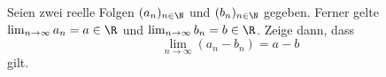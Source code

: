 \begin{exercise}
  Seien zwei reelle Folgen $(a_n)_{n \in \N}$ und $(b_n)_{n \in \N}$ gegeben.
  Ferner gelte $\lim_{n \to \infty} a_n = a \in \R$ und $\lim_{n \to \infty} b_n =
  b \in \R$. Zeige dann, dass
  \[
    \lim_{n \to \infty} \left( a_n - b_n \right)
    =
    a - b
  \]
  gilt.
\end{exercise}
